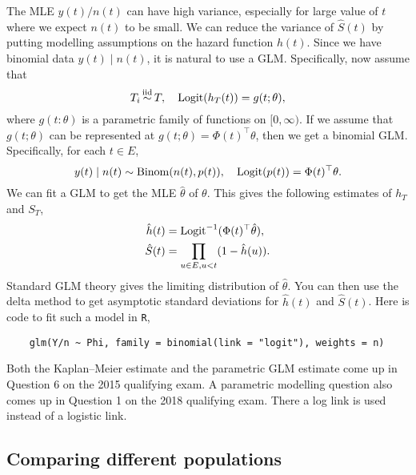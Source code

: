 The MLE $y(t)/n(t)$ can have high variance, especially for large value of $t$ where we expect $n(t)$ to be small. We can reduce the variance of $\hat{S}(t)$ by putting modelling assumptions on the hazard function $h(t)$. Since we have binomial data $y(t)\mid n(t)$, it is natural to use a GLM. Specifically, now assume that
\[
    T_i \simiid T, \quad \logit( h_T(t)) = g(t;\theta),
\] 
where $g(t:\theta)$ is a parametric family of functions on $[0,\infty)$. If we assume that $g(t;\theta)$ can be represented at $g(t;\theta) = \Phi(t)^\top \theta$, then we get a binomial GLM. Specifically, for each $t \in E$,
\[ 
    y(t) \mid n(t) \sim \mathrm{Binom}(n(t), p(t)), \quad \mathrm{Logit}(p(t)) = \Phi(t)^\top \theta.    
\]
We can fit a GLM to get the MLE $\hat{\theta}$ of $\theta$. This gives the following estimates of $h_T$ and $S_T$,
\begin{align*}
    \hat{h}(t)&=\mathrm{Logit}^{-1}(\Phi(t)^\top \hat{\theta}),\\
    \hat{S}(t)&=\prod_{u \in E, u < t}(1-\hat{h}(u)).
\end{align*}
Standard GLM theory gives the limiting distribution of $\hat{\theta}$. You can then use the delta method to get asymptotic standard deviations for $\hat{h}(t)$ and $\hat{S}(t)$. Here is code to fit such a model in \verb|R|,

\begin{lstlisting} 
    glm(Y/n ~ Phi, family = binomial(link = "logit"), weights = n) 
\end{lstlisting}

Both the Kaplan--Meier estimate and the parametric GLM estimate come up in Question 6 on the 2015 qualifying exam. A parametric modelling question also comes up in Question 1 on the 2018 qualifying exam. There a log link is used instead of a logistic link.

\subsection{Comparing different populations}

